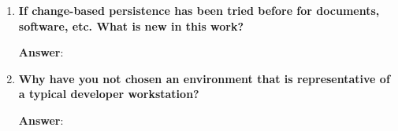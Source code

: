 \begin{enumerate}
  \item \textbf{If change-based persistence has been tried before for documents, software, etc. What is new in this work?}
  
  \textbf{Answer}:
  
  \item \textbf{Why have you not chosen an environment that is representative of a typical developer workstation?}
  
  \textbf{Answer}:
  
\end{enumerate}